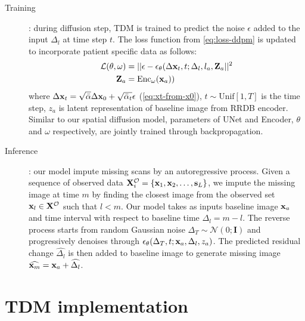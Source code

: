 \begin{description}
    \item[Training]: during diffusion step, TDM is trained to predict the noise $\epsilon$ added to the input $\Delta_l$ at time step $t$. The loss function from \cref{eq:loss-ddpm} is updated to incorporate patient specific data as follows: 
    \begin{equation}
    \label{eq:loss-tdm}
        \begin{aligned}
        \mathcal{L} (\theta, \omega) &= ||\epsilon - \epsilon_{\theta} (\Delta{\mathbf{x}}_t, t; \Delta_l, l_a, \mathbf{Z}_a ||^2 \\
        \mathbf{Z}_a &= \mathrm{Enc_{\omega}}({\mathbf{x}}_a))
        \end{aligned}
    \end{equation}
    where $\Delta{\mathbf{x}}_t = \sqrt{\bar\alpha} \Delta{\mathbf{x}}_0 + \sqrt{\bar\alpha_t} \epsilon$ (\cref{eq:xt-from-x0}), $t \sim \mathrm{Unif}[1, T]$ is the time step, $z_a$ is latent representation of baseline image from RRDB encoder. Similar to our spatial diffusion model, parameters of UNet and Encoder, $\theta$ and $\omega$ respectively, are jointly trained through backpropagation. 
    
    \item[Inference]: our model impute missing scans by an autoregressive process. Given a sequence of observed data $\mathbf{X}^{\mathcal{O}}_{i} = \{{\mathbf{x}}_1, {\mathbf{x}}_2, \dots, {\mathbf{s}}_L\}$, we impute the missing image at time $m$ by finding the closest image from the observed set ${\mathbf{x}}_l \in \mathbf{X}^{\mathcal{O}}$ such that $l < m$. Our model takes as inputs baseline image ${\mathbf{x}}_a$ and time interval with respect to baseline time $\Delta_l = m -l$. The reverse process starts from random Gaussian noise $\Delta_T \sim \mathcal{N}(0; \mathbf{I})$ and progressively denoises through $\epsilon_{\theta}(\Delta_T, t; {\mathbf{x}}_a, \Delta_l, z_a)$. The predicted residual change $\widehat{\Delta_l}$ is then added to baseline image to generate missing image $\widehat{{\mathbf{x}}_m} = {\mathbf{x}}_a + \widehat{\Delta_l}$. 
\end{description}

\section{TDM implementation}
\label{sec:tdm-implement}

